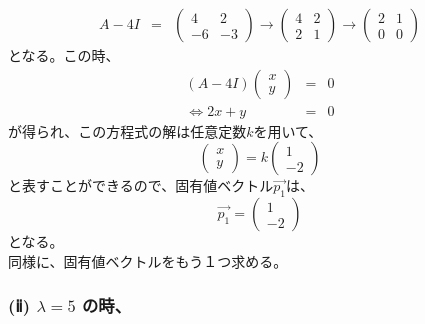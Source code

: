 \documentclass[dvipdfmx,uplatex]{jsarticle}
\begin{document}
\begin{spacing}{1.6}
\begin{qparts}
  \begin{eqnarray*}
    A - 4I & = &
    \left(
    \begin{array}{ccc}
      4 & 2 \\
      -6 & -3
    \end{array}
    \right)
    \rightarrow
    \left(
    \begin{array}{ccc}
      4 & 2 \\
      2 & 1
    \end{array}
    \right)
    \rightarrow
    \left(
    \begin{array}{ccc}
      2 & 1 \\
      0 & 0
    \end{array}
    \right)
  \end{eqnarray*}
  となる。この時、
  \begin{eqnarray*}
    (A - 4I) \left(
    \begin{array}{ccc}
      x \\
      y
    \end{array}
    \right)
    & = & 0 \\
    \Leftrightarrow
    2x + y & = & 0
  \end{eqnarray*}
  が得られ、この方程式の解は任意定数$k$を用いて、
  \begin{equation*}
    \left(
    \begin{array}{ccc}
      x \\
      y
    \end{array}
    \right)
    = k
    \left(
    \begin{array}{ccc}
      1 \\
      -2
    \end{array}
    \right)
  \end{equation*}
  と表すことができるので、固有値ベクトル$\overrightarrow{p_1}$は、
  \begin{equation}
    \overrightarrow{p_1} =
    \left(
    \begin{array}{ccc}
      1 \\
      -2
    \end{array}
    \right)
  \end{equation}
  となる。\\

  同様に、固有値ベクトルをもう１つ求める。

  \subsubsection*{(ⅱ) $ \lambda = 5 $ の時、}


\end{qparts}
\end{spacing}
\end{document}
